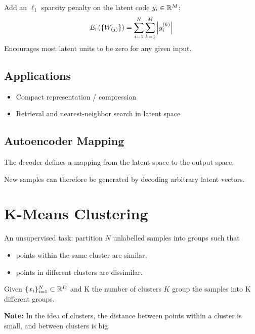 \documentclass[11pt,a4paper,openany]{book}
\begin{document}
\begin{defnbox}[title=Sparse Autoencoder]
Add an \(\ell_1\) sparsity penalty on the latent code \(y_i \in \mathbb{R}^M\):
\[
E_r(\{W_{(j)}\}) = \sum_{i=1}^{N}\sum_{k=1}^{M}\left\lvert y_i^{(k)} \right\rvert
\]
Encourages most latent units to be zero for any given input.
\end{defnbox}

\subsection{Applications}

\begin{keybox}[title=Autoencoder Applications]
\begin{itemize}
    \item Compact representation / compression
    \item Retrieval and nearest-neighbor search in latent space
\end{itemize}
\end{keybox}

\subsection{Autoencoder Mapping}

\begin{propbox}[title=Decoder mapping]
The decoder defines a mapping from the latent space to the output space.

New samples can therefore be generated by decoding arbitrary latent vectors.
\end{propbox}

\newpage \section{K-Means Clustering}

\begin{defnbox}[title=Clustering]
An unsupervised task: partition \(N\) unlabelled samples into groups such that
\begin{itemize}
  \item points within the same cluster are similar,
  \item points in different clusters are dissimilar.
\end{itemize}
\end{defnbox}

\begin{defnbox}[title=K-Means Problem]
Given \(\{x_i\}_{i=1}^N \subset \mathbb{R}^D\) and K the number of clusters \(K\) group the samples into K different groups.

\textbf{Note:} In the idea of clusters, the distance between points within a cluster is small, and between clusters is big.
\end{defnbox}
\end{document}
